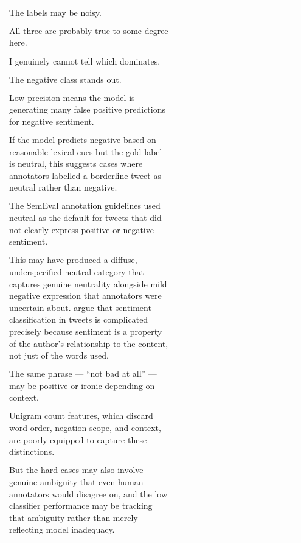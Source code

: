 \documentclass[11pt]{article}
\begin{document}
\begin{longtable}{|p{0.55\linewidth}|p{0.40\linewidth}|}
\hline
\rule{0pt}{3.5cm} & \\
\hline
The labels may be noisy. & \\[2pt]
\hline
\rule{0pt}{3.5cm} & \\
\hline
All three are probably true to some degree here. & \\[2pt]
\hline
\rule{0pt}{3.5cm} & \\
\hline
I genuinely cannot tell which dominates. & \\[2pt]
\hline
\rule{0pt}{3.5cm} & \\
\hline
The negative class stands out. & \\[2pt]
\hline
\rule{0pt}{3.5cm} & \\
\hline
Low precision means the model is generating many false positive predictions for negative sentiment. & \\[2pt]
\hline
\rule{0pt}{3.5cm} & \\
\hline
If the model predicts negative based on reasonable lexical cues but the gold label is neutral, this suggests cases where annotators labelled a borderline tweet as neutral rather than negative. & \\[2pt]
\hline
\rule{0pt}{3.5cm} & \\
\hline
The SemEval annotation guidelines used neutral as the default for tweets that did not clearly express positive or negative sentiment. & \\[2pt]
\hline
\rule{0pt}{3.5cm} & \\
\hline
This may have produced a diffuse, underspecified neutral category that captures genuine neutrality alongside mild negative expression that annotators were uncertain about. argue that sentiment classification in tweets is complicated precisely because sentiment is a property of the author's relationship to the content, not just of the words used. & \\[2pt]
\hline
\rule{0pt}{3.5cm} & \\
\hline
The same phrase --- ``not bad at all'' --- may be positive or ironic depending on context. & \\[2pt]
\hline
\rule{0pt}{3.5cm} & \\
\hline
Unigram count features, which discard word order, negation scope, and context, are poorly equipped to capture these distinctions. & \\[2pt]
\hline
\rule{0pt}{3.5cm} & \\
\hline
But the hard cases may also involve genuine ambiguity that even human annotators would disagree on, and the low classifier performance may be tracking that ambiguity rather than merely reflecting model inadequacy. & \\[2pt]

\end{longtable}
\end{document}
